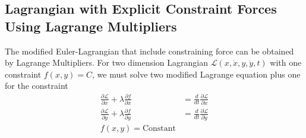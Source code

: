 \documentclass[../../../main.tex]{subfiles}
\begin{document}
\subsection*{Lagrangian with Explicit Constraint Forces Using Lagrange Multipliers}
The modified Euler-Lagrangian that include constraining force can be obtained by Lagrange Multipliers. 
For two dimension Lagrangian $\mathcal{L}(x,\dot{x},y,\dot{y},t)$ with one constraint $f(x,y)=C$, we must solve two modified Lagrange equation plus one for the constraint
\begin{align*}
	\frac{\partial \mathcal{L}}{\partial x}+\lambda\frac{\partial f}{\partial x}&=\frac{d}{dt}\frac{\partial \mathcal{L}}{\partial \dot{x}}\\
	\frac{\partial \mathcal{L}}{\partial y}+\lambda\frac{\partial f}{\partial y}&=\frac{d}{dt}\frac{\partial \mathcal{L}}{\partial \dot{y}}\\
	f(x,y)=\text{Constant}
\end{align*}
\end{document}
